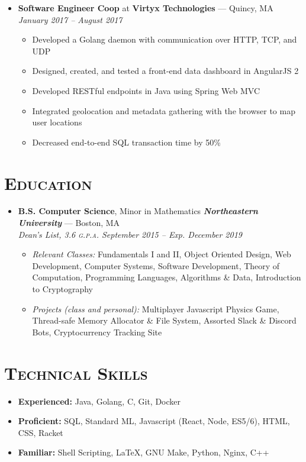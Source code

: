 \documentclass{article}
\begin{document}
\begin{itemize}[label={},leftmargin=*]
  \item \textbf{Software Engineer Coop} at \textbf{Virtyx Technologies} --- Quincy, MA \hfill {\em January 2017 -- August 2017}
  \begin{itemize}[label={$\bullet$}]
    \item Developed a Golang daemon with communication over HTTP, TCP, and UDP
    \item Designed, created, and tested a front-end data dashboard in AngularJS 2
    \item Developed RESTful endpoints in Java using Spring Web MVC
    \item Integrated geolocation and metadata gathering with the browser to map user locations
    \item Decreased end-to-end SQL transaction time by 50\%
  \end{itemize}
\end{itemize}

\section*{\textsc{Education}}
\begin{itemize}[label={},leftmargin=*]
  \item \textbf{B.S. Computer Science}, Minor in Mathematics \hfill \textit{\textbf{Northeastern University}} --- Boston, MA \\
  \em{Dean's List}, 3.6 \textsc{g.p.a.}  \hfill \em{\textit{September 2015 -- Exp. December 2019}}
  \begin{itemize}
    \item[] \textit{Relevant Classes:} Fundamentals I and II, Object Oriented Design, Web Development, Computer Systems, Software Development, Theory of Computation, Programming Languages, Algorithms \& Data, Introduction to Cryptography\\
    \item[] \textit{Projects (class and personal):} Multiplayer Javascript Physics Game, Thread-safe Memory Allocator \& File System, Assorted Slack \& Discord Bots, Cryptocurrency Tracking Site
  \end{itemize}
\end{itemize}

\section*{\textsc{Technical Skills}}
\begin{itemize}[label={},leftmargin=*]
  \item \textbf{Experienced:} Java, Golang, C, Git, Docker
  \item \textbf{Proficient:} SQL, Standard ML, Javascript (React, Node, ES5/6), HTML, CSS, Racket
  \item \textbf{Familiar:} Shell Scripting, LaTeX, GNU Make, Python, Nginx, C++
\end{itemize}
\end{document}
